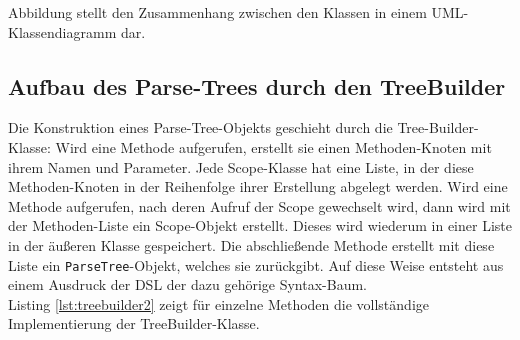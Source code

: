 \noindent
Abbildung stellt den Zusammenhang zwischen den Klassen in einem UML-Klassendiagramm dar.

\subsection{Aufbau des Parse-Trees durch den TreeBuilder}\label{ssct:4.3.4:aufbau}
Die Konstruktion eines Parse-Tree-Objekts geschieht durch die Tree-Builder-Klasse: Wird eine Methode aufgerufen, erstellt sie einen Methoden-Knoten mit ihrem Namen und Parameter. Jede Scope-Klasse hat eine Liste, in der diese Methoden-Knoten in der Reihenfolge ihrer Erstellung abgelegt werden. Wird eine Methode aufgerufen, nach deren Aufruf der Scope gewechselt wird, dann wird mit der Methoden-Liste ein Scope-Objekt erstellt. Dieses wird wiederum in einer Liste in der äußeren Klasse gespeichert. Die abschließende Methode erstellt mit diese Liste ein \texttt{ParseTree}-Objekt, welches sie zurückgibt. Auf diese Weise entsteht aus einem Ausdruck der DSL der dazu gehörige Syntax-Baum.\\
Listing \ref{lst:treebuilder2} zeigt für einzelne Methoden die vollständige Implementierung der TreeBuilder-Klasse.\\


